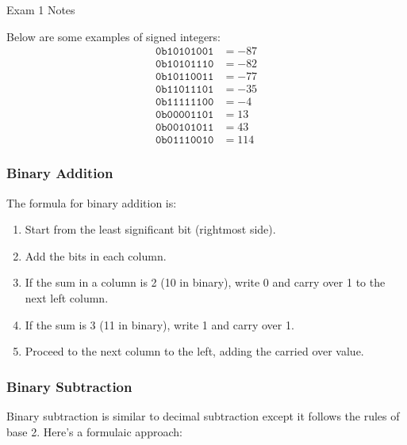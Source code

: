 \begin{examnotes}{Exam 1 Notes}
    \begin{highlight}
        Below are some examples of signed integers:
        \begin{align*}
            \texttt{0b10101001} & = -87 \\
            \texttt{0b10101110} & = -82 \\
            \texttt{0b10110011} & = -77 \\
            \texttt{0b11011101} & = -35 \\
            \texttt{0b11111100} & = -4 \\
            \texttt{0b00001101} & = 13 \\
            \texttt{0b00101011} & = 43 \\
            \texttt{0b01110010} & = 114
        \end{align*}
    \end{highlight}

    \subsubsection*{Binary Addition}

    The formula for binary addition is:

    \begin{enumerate}
        \item Start from the least significant bit (rightmost side).
        \item Add the bits in each column.
        \item If the sum in a column is 2 (10 in binary), write 0 and carry over 1 to the next left column.
        \item If the sum is 3 (11 in binary), write 1 and carry over 1.
        \item Proceed to the next column to the left, adding the carried over value.
    \end{enumerate}

    \subsubsection*{Binary Subtraction}

    Binary subtraction is similar to decimal subtraction except it follows the rules of base 2. Here's a formulaic approach:


\end{examnotes}
